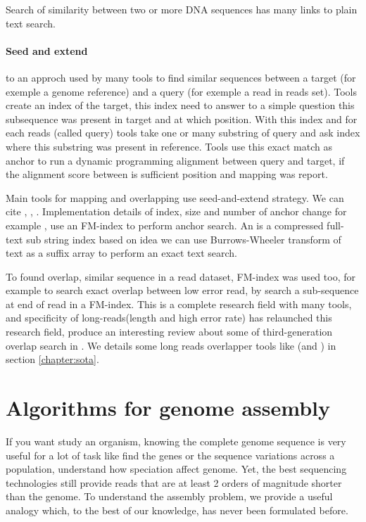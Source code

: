 \documentclass[./main.tex]{subfiles}
\begin{document}
Search of similarity between two or more DNA sequences has many links to plain text search.

\paragraph{Seed and extend} to an approch used by many tools to find similar sequences between a target (for exemple a genome reference) and a query (for exemple a read in reads set). Tools create an index of the target, this index need to answer to a simple question this subsequence was present in target and at which position. With this index and for each reads (called query) tools take one or many substring of query and ask index where this substring was present in reference. Tools use this exact match as anchor to run a \citeauthor{smith_waterman}\cite{smith_waterman} dynamic programming alignment between query and target, if the alignment score between is sufficient position and mapping was report.

Main tools for mapping and overlapping use seed-and-extend strategy. We can cite  \cite{blast_one, blast_two},  \cite{bwa_mem},  \cite{blasr}. Implementation details of index, size and number of anchor change for example ,  use an FM-index \cite{fm-index} to perform anchor search. An is a compressed full-text sub string index based on idea we can use Burrows-Wheeler transform of text as a suffix array to perform an exact text search. 

To found overlap, similar sequence in a read dataset, FM-index was used too, for example  \cite{SGA} to search exact overlap between low error read, by search a sub-sequence at end of read in a FM-index. This is a complete research field with many tools, and specificity of long-reads(length and high error rate) has relaunched this research field, \citeauthor{ovl_bench} produce an interesting review about some of third-generation overlap search in \cite{ovl_bench}. We details some long reads overlapper tools like (\mhap and \minimap) in section \ref{chapter:sota}.

\section{Algorithms for genome assembly}

If you want study an organism, knowing the complete genome sequence is very useful for a lot of task like find the genes or the sequence variations across a population, understand how speciation affect genome. Yet, the best sequencing technologies still provide reads that are at least 2 orders of magnitude shorter than the genome. To understand the assembly problem, we provide a useful analogy which, to the best of our knowledge, has never been formulated before.
\end{document}
